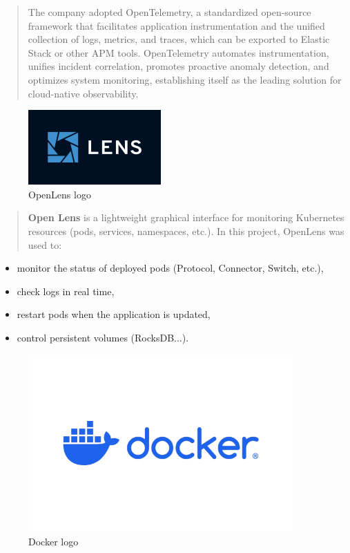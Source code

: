 \documentclass[12pt,a4paper]{report}
\begin{document}
\begin{quote}
The company adopted OpenTelemetry, a standardized open-source framework
that facilitates application instrumentation and the unified collection
of logs, metrics, and traces, which can be exported to Elastic Stack or
other APM tools. OpenTelemetry automates instrumentation, unifies
incident correlation, promotes proactive anomaly detection, and
optimizes system monitoring, establishing itself as the leading solution
for cloud-native observability.
\end{quote}

\begin{figure}[H]
\centering
\includegraphics[width=2in]{media/image89.png}
\caption{OpenLens logo}
\label{fig:openlens-logo}
\end{figure}

\begin{quote}
\textbf{Open Lens} is a lightweight graphical interface for monitoring
Kubernetes resources (pods, services, namespaces, etc.). In this
project, OpenLens was used to:
\end{quote}

\begin{itemize}
\item
  monitor the status of deployed pods (Protocol, Connector, Switch,
  etc.),
\item
  check logs in real time,
\item
  restart pods when the application is updated,
\item
  control persistent volumes (RocksDB...).
\end{itemize}

\begin{figure}[H]
\centering
\includegraphics[width=4in]{media/image90.png}
\caption{Docker logo}
\label{fig:docker-logo}
\end{figure}
\end{document}
